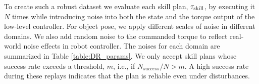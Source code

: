 To create such a robust dataset we evaluate each skill plan, $\tau_{\text{skill}}$, by executing it $N$ times while introducing noise into both the state and the torque output of the low-level controller. For object pose, we apply different scales of noise in different domains. We also add random noise to the commanded torque to reflect real-world noise effects in robot controller. The noises for each domain are summarized in Table \ref{table:DR_params}. We only accept skill plans whose success rate exceeds a threshold, $m$, i.e., if $N_{success}/N > m$. A high success rate during these replays indicates that the plan is reliable even under disturbances. 











\iffalse
\begin{algorithm}[H]
\caption{Data filtering}\label{algo:Collect_data}
\begin{algorithmic}[1]
\State \textbf{Input:} Skill library ${\mathcal{O}} = \{o_{\text{NP}_1}, o_{\text{NP}_2}, \ldots, o_{\text{NP}_n}, o_{\text{Place}}\}$
\State \textbf{Initialize:} Counter $n \leftarrow 0$, dataset $\mathcal{D} \leftarrow \emptyset$
\While{$n < 500$}
    \State Randomly sample initial $q^\text{obj}_{\text{init}}$ and goal object pose $q^\text{obj}_{\text{goal}}$
    \State Generate skill plan $\tau_{\text{skill}} = \text{Skill-RRT}(q^\text{obj}_{\text{init}}, q^\text{obj}_{\text{goal}}, {\mathcal{O}})$
    \State Replay the skill plan $\tau_{\text{skill}}$ 400 times to obtain full trajectories $\tau_{\text{full}}^{(i)}$ for $i = 1, \ldots, 400$
    \State Compute replay success rate $r = \frac{1}{400} \sum \text{success}(\tau_{\text{full}}^{(i)})$
    \If{$r \geq 0.9$}
        \State $\mathcal{D} \leftarrow \mathcal{D} \cup \{\text{selected 30 successful trajectories}\}$
        \State $n \leftarrow n + 1$
    \EndIf
\EndWhile
\end{algorithmic}
\end{algorithm}
\fi

